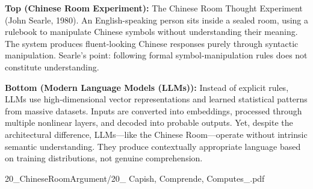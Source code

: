 \begin{SideNotePage}{
  \textbf{Top (Chinese Room Experiment):} The Chinese Room Thought Experiment (John Searle, 1980). An English-speaking person sits inside a sealed room, using a rulebook to manipulate Chinese symbols without understanding their meaning. The system produces fluent-looking Chinese responses purely through syntactic manipulation. Searle’s point: following formal symbol-manipulation rules does not constitute understanding. \par
  \textbf{Bottom (Modern Language Models (LLMs)):} Instead of explicit rules, LLMs use high-dimensional vector representations and learned statistical patterns from massive datasets. Inputs are converted into embeddings, processed through multiple nonlinear layers, and decoded into probable outputs. Yet, despite the architectural difference, LLMs—like the Chinese Room—operate without intrinsic semantic understanding. They produce contextually appropriate language based on training distributions, not genuine comprehension.
}{20_ChineseRoomArgument/20_ Capish, Comprende, Computes_.pdf}
\end{SideNotePage}
